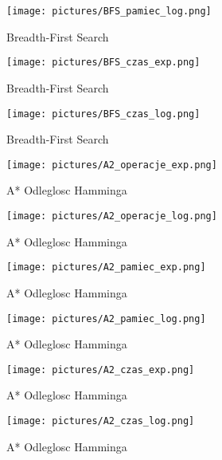 \documentclass{classrep}
\begin{document}
\begin{figure}[ht]
\centering
			\texttt{[image: pictures/BFS\_pamiec\_log.png]}
	\caption{Breadth-First Search}
	\label{fig:Breadth-First Search}
\end{figure}

\begin{figure}[ht]
\centering
			\texttt{[image: pictures/BFS\_czas\_exp.png]}
	\caption{Breadth-First Search}
	\label{fig:Breadth-First Search}
\end{figure}

\begin{figure}[ht]
\centering
			\texttt{[image: pictures/BFS\_czas\_log.png]}
	\caption{Breadth-First Search}
	\label{fig:Breadth-First Search}
\end{figure}

\begin{figure}[ht]
\centering
			\texttt{[image: pictures/A2\_operacje\_exp.png]}
	\caption{A* Odleglosc Hamminga}
	\label{fig:A* Odleglosc Hamminga}
\end{figure}

\begin{figure}[ht]
\centering
			\texttt{[image: pictures/A2\_operacje\_log.png]}
	\caption{A* Odleglosc Hamminga}
	\label{fig:A* Odleglosc Hamminga}
\end{figure}

\begin{figure}[ht]
\centering
			\texttt{[image: pictures/A2\_pamiec\_exp.png]}
	\caption{A* Odleglosc Hamminga}
	\label{fig:A* Odleglosc Hammingav}
\end{figure}

\begin{figure}[ht]
\centering
			\texttt{[image: pictures/A2\_pamiec\_log.png]}
	\caption{A* Odleglosc Hamminga}
	\label{fig:A* Odleglosc Hamminga}
\end{figure}

\begin{figure}[ht]
\centering
			\texttt{[image: pictures/A2\_czas\_exp.png]}
	\caption{A* Odleglosc Hamminga}
	\label{fig:A* Odleglosc Hamminga}
\end{figure}

\begin{figure}[ht]
\centering
			\texttt{[image: pictures/A2\_czas\_log.png]}
	\caption{A* Odleglosc Hamminga}
	\label{fig:A* Odleglosc Hamminga}
\end{figure}
\end{document}
